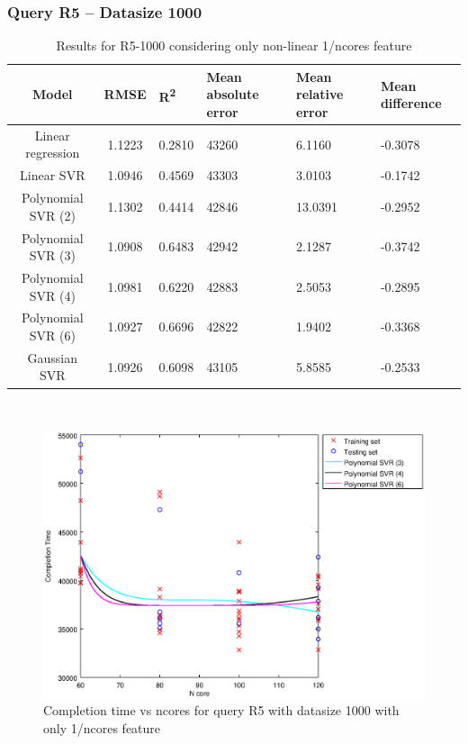 \documentclass[a4paper,11pt]{article}
\begin{document}
\newpage
\subsubsection{Query R5 -- Datasize 1000}
\begin{table}[H]
	\centering
	\begin{adjustbox}{center}
		\begin{tabular}{c | c M{1.2cm} M{2.5cm} M{2.5cm} M{1.8cm}}
			Model & RMSE & R\textsuperscript{2} & Mean absolute error & Mean relative error & Mean difference \tabularnewline
			\hline
			Linear regression & 1.1223 & 0.2810 &  43260 & 6.1160 & -0.3078 \\
			Linear SVR & 1.0946 & 0.4569 &  43303 & 3.0103 & -0.1742 \\
			Polynomial SVR (2) & 1.1302 & 0.4414 &  42846 & 13.0391 & -0.2952 \\
			Polynomial SVR (3) & 1.0908 & 0.6483 &  42942 & 2.1287 & -0.3742 \\
			Polynomial SVR (4) & 1.0981 & 0.6220 &  42883 & 2.5053 & -0.2895 \\
			Polynomial SVR (6) & 1.0927 & 0.6696 &  42822 & 1.9402 & -0.3368 \\
			Gaussian SVR & 1.0926 & 0.6098 &  43105 & 5.8585 & -0.2533 \\
		\end{tabular}
	\end{adjustbox}
	\\
	\caption{Results for R5-1000 considering only non-linear 1/ncores feature}
	\label{table_R5_prediction_all}
\end{table}

\begin {figure}[hbtp]
\centering
\includegraphics[width=\textwidth]{output/R5_1000_ONLY_1_OVER_NCORES/plot_R5_1000_bestmodels.eps}
\caption {Completion time vs ncores for query R5 with datasize 1000 with only 1/ncores feature}
\end {figure}
\end{document}
